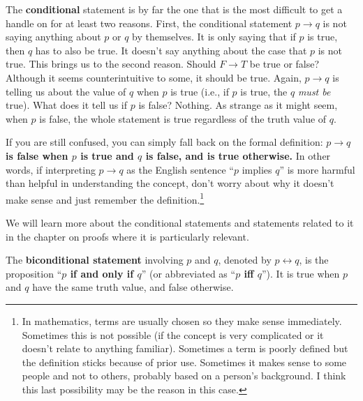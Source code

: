 \begin{rem}
The {\bf conditional} statement is by far the one that is the most difficult to get a handle on for at least
two reasons.  First, the conditional statement $p \rightarrow q$ is not saying anything about $p$ or $q$ by themselves.
It is only saying that if $p$ is true, then $q$ has to also be true.  
It doesn't say anything about the case that $p$ is
not true.  This brings us to the second reason.
Should $F \rightarrow T$ be true or false?  Although it seems counterintuitive to some, it should be true.  
Again, $p \rightarrow q$ is telling us about the value of $q$ when $p$ is true 
(i.e., if $p$ is true, the $q$ {\em must be} true).  
What does it tell us if $p$ is false?  Nothing.  As strange as it might seem, when $p$ is
false, the whole statement is true regardless of the truth value of $q$.

If you are still confused, you can simply fall back on the formal definition:
{\bf \boldmath$p \rightarrow q$ is false when \boldmath$p$ is true and \boldmath$q$ is false, 
and is true otherwise.}
In other words, if interpreting $p \rightarrow q$ as 
the English sentence ``$p$ implies $q$'' is more harmful than helpful in understanding
the concept, don't worry about why it doesn't make sense and just remember 
the definition.\footnote{In mathematics, 
terms are usually chosen so they make sense immediately.  
Sometimes this is not possible (if the concept is very complicated or it 
doesn't relate to anything familiar). Sometimes a term
is poorly defined but the definition sticks because of prior use.  
Sometimes it makes sense to some people and not to others, 
probably based on a person's background.
I think this last possibility may be the reason in this case.}
\end{rem}

We will learn more about the conditional statements and
statements related to it in the chapter on proofs where it
is particularly relevant. 

\begin{df}
The {\bf biconditional statement}  involving $p$ and $q$,
denoted by \boldmath$p \leftrightarrow q$, is the proposition ``{\bf \boldmath$p$ if and only if \boldmath$q$}''
(or abbreviated as ``{\bf \boldmath$p$ iff \boldmath$q$}'').
It is true when $p$ and $q$ have the same truth value, and false otherwise.
\end{df}

